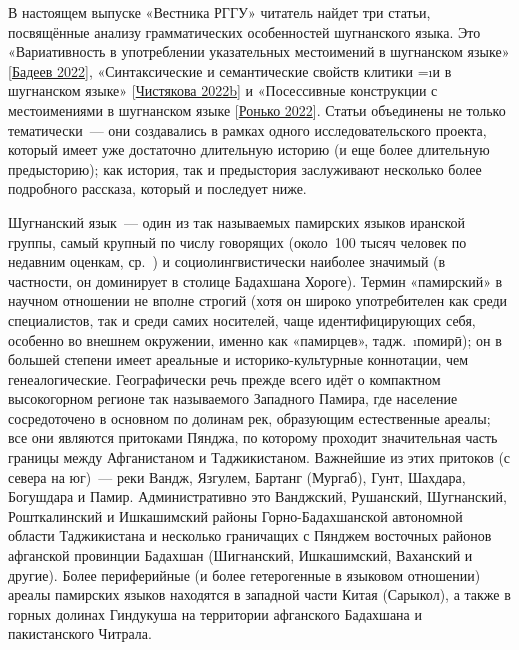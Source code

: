 В настоящем выпуске «Вестника РГГУ» читатель найдет три статьи, посвящённые анализу грамматических особенностей шугнанского языка. Это «Вариативность в употреблении указательных местоимений в шугнанском языке» [\hyperref[chapter-badeev-demon]{Бадеев 2022}], «Синтаксические и семантические свойств клитики =\i{и} в шугнанском языке» [\hyperref[chapter-chist-clitic]{Чистякова 2022b}] и «Посессивные конструкции с местоимениями в шугнанском языке [\hyperref[chapter-ronko-poss]{Ронько 2022}]. Статьи объединены не только тематически~— они создавались в рамках одного исследовательского проекта, который имеет уже достаточно длительную историю (и еще более длительную предысторию); как история, так и предыстория заслуживают несколько более подробного рассказа, который и последует ниже.

Шугнанский язык~— один из так называемых памирских языков иранской группы, самый крупный по числу говорящих (около~100 тысяч человек по недавним оценкам, ср.~\parencites[225]{edelman_yusufbekov1999_shughni}[7–9]{kalandarov2004}) и социолингвистически наиболее значимый (в частности, он доминирует в столице Бадахшана Хороге). Термин «памирский» в научном отношении не вполне строгий (хотя он широко употребителен как среди специалистов, так и среди самих носителей, чаще идентифицирующих себя, особенно во внешнем окружении, именно как «памирцев», тадж.~\i{помирӣ}); он в большей степени имеет ареальные и историко-культурные коннотации, чем генеалогические. Географически речь прежде всего идёт о компактном высокогорном регионе так называемого Западного Памира, где население сосредоточено в основном по долинам рек, образующим естественные ареалы; все они являются притоками Пянджа, по которому проходит значительная часть границы между Афганистаном и Таджикистаном. Важнейшие из этих притоков (с севера на юг)~— реки Вандж, Язгулем, Бартанг (Мургаб), Гунт, Шахдара, Богушдара и Памир. Административно это Ванджский, Рушанский, Шугнанский, Рошткалинский и Ишкашимский районы Горно-Бадахшанской автономной области Таджикистана и несколько граничащих с Пянджем восточных районов афганской провинции Бадахшан (Шигнанский, Ишкашимский, Ваханский и другие). Более периферийные (и более гетерогенные в языковом отношении) ареалы памирских языков находятся в западной части Китая (Сарыкол), а также в горных долинах Гиндукуша на территории афганского Бадахшана и пакистанского Читрала.

